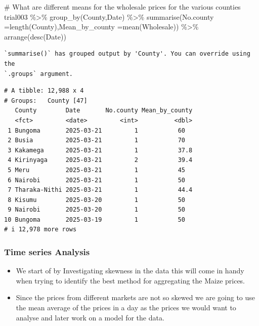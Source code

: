 \documentclass[
  letterpaper,
  DIV=11,
  numbers=noendperiod]{scrartcl}
\newenvironment{Shaded}{\begin{snugshade}}{\end{snugshade}}
\newcommand{\AttributeTok}[1]{\textcolor[rgb]{0.40,0.45,0.13}{#1}}
\newcommand{\CommentTok}[1]{\textcolor[rgb]{0.37,0.37,0.37}{#1}}
\newcommand{\FunctionTok}[1]{\textcolor[rgb]{0.28,0.35,0.67}{#1}}
\newcommand{\NormalTok}[1]{\textcolor[rgb]{0.00,0.23,0.31}{#1}}
\newcommand{\SpecialCharTok}[1]{\textcolor[rgb]{0.37,0.37,0.37}{#1}}
\begin{document}
\begin{Shaded}
\begin{Highlighting}[]
\CommentTok{\# What are different means for the wholesale prices for the various counties}
\NormalTok{trial003 }\SpecialCharTok{\%\textgreater{}\%} \FunctionTok{group\_by}\NormalTok{(County,Date) }\SpecialCharTok{\%\textgreater{}\%} \FunctionTok{summarise}\NormalTok{(}\AttributeTok{No.county =}\FunctionTok{length}\NormalTok{(County),}\AttributeTok{Mean\_by\_county =}\FunctionTok{mean}\NormalTok{(Wholesale)) }\SpecialCharTok{\%\textgreater{}\%} \FunctionTok{arrange}\NormalTok{(}\FunctionTok{desc}\NormalTok{(Date))}
\end{Highlighting}
\end{Shaded}

\begin{verbatim}
`summarise()` has grouped output by 'County'. You can override using the
`.groups` argument.
\end{verbatim}

\begin{verbatim}
# A tibble: 12,988 x 4
# Groups:   County [47]
   County        Date       No.county Mean_by_county
   <fct>         <date>         <int>          <dbl>
 1 Bungoma       2025-03-21         1           60  
 2 Busia         2025-03-21         1           70  
 3 Kakamega      2025-03-21         1           37.8
 4 Kirinyaga     2025-03-21         2           39.4
 5 Meru          2025-03-21         1           45  
 6 Nairobi       2025-03-21         1           50  
 7 Tharaka-Nithi 2025-03-21         1           44.4
 8 Kisumu        2025-03-20         1           50  
 9 Nairobi       2025-03-20         1           50  
10 Bungoma       2025-03-19         1           50  
# i 12,978 more rows
\end{verbatim}

\subsubsection{Time series Analysis}\label{time-series-analysis}

\begin{itemize}
\item
  We start of by Investigating skewness in the data this will come in
  handy when trying to identify the best method for aggregating the
  Maize prices.
\item
  Since the prices from different markets are not so skewed we are going
  to use the mean average of the prices in a day as the prices we would
  want to analyse and later work on a model for the data.
\end{itemize}
\end{document}
